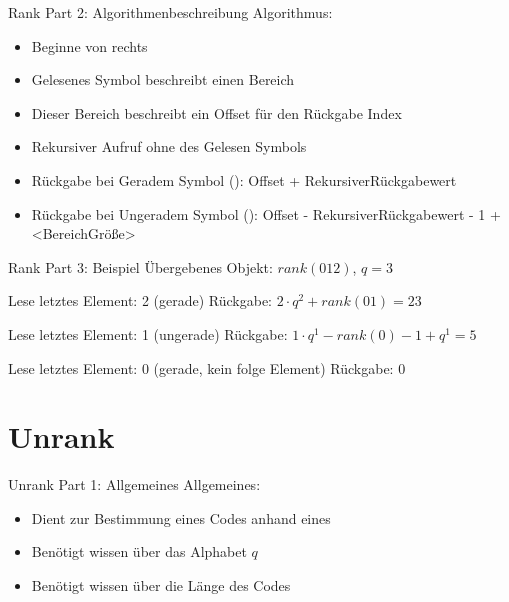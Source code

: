 \documentclass[aspectratio=169]{beamer}
\begin{document}
    \begin{frame}{Rank \newline Part 2: Algorithmenbeschreibung}
    Algorithmus:
	\begin{itemize}
	    \item Beginne von rechts
	    \item Gelesenes Symbol beschreibt einen Bereich
	    \item Dieser Bereich beschreibt ein Offset für den Rückgabe Index
	    \item Rekursiver Aufruf ohne des Gelesen Symbols \newline
	    \item Rückgabe bei Geradem Symbol (): \newline Offset + RekursiverRückgabewert \newline
		\item Rückgabe bei Ungeradem Symbol (): \newline Offset - RekursiverRückgabewert - 1 + <BereichGröße>
    \end{itemize}
    \end{frame}

	\begin{frame}{Rank \newline Part 3: Beispiel}
	Übergebenes Objekt: $rank(012)$, $q=3$ \newline
	
	Lese letztes Element: 2 (gerade)\newline
	Rückgabe: $2 \cdot q^2 + rank(01) = 23$\newline
	
	Lese letztes Element: 1 (ungerade) \newline
	Rückgabe: $1 \cdot q^1 - rank(0) - 1 + q^1 = 5$\newline
	
	Lese letztes Element: 0 (gerade, kein folge Element) \newline
	Rückgabe: $0$
	\end{frame}


\section{Unrank}
    \begin{frame}{Unrank \newline Part 1: Allgemeines}
    Allgemeines:
    \begin{itemize}
	    \item Dient zur Bestimmung eines Codes anhand eines 
	    \item Benötigt wissen über das Alphabet $q$
	    \item Benötigt wissen über die Länge des Codes
    \end{itemize}
    \end{frame}
    
\end{document}
